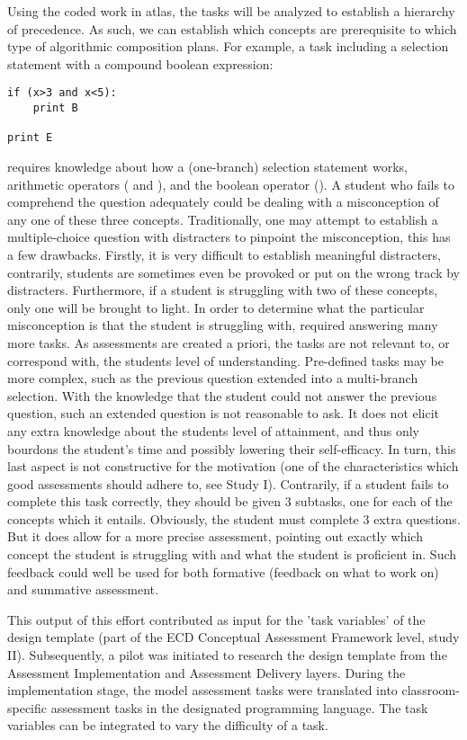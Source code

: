 Using the coded work in atlas, the tasks will be analyzed to establish a hierarchy of precedence. As such, we can establish which concepts are prerequisite to which type of algorithmic composition plans. For example, a task including a selection statement with a compound boolean expression:
\begin{verbatim}
if (x>3 and x<5):
    print B

print E
\end{verbatim}
requires knowledge about how a (one-branch) selection statement works, arithmetic operators (\jav{<} and \jav{>}), and the boolean operator (). A student who fails to comprehend the question adequately could be dealing with a misconception of any one of these three concepts. Traditionally, one may attempt to establish a multiple-choice question with distracters to pinpoint the misconception, this has a few drawbacks. Firstly, it is very difficult to establish meaningful distracters, contrarily, students are sometimes even be provoked or put on the wrong track by distracters. Furthermore, if a student is struggling with two of these concepts, only one will be brought to light. In order to determine what the particular misconception is that the student is struggling with, required answering many more tasks. As assessments are created a priori, the tasks are not relevant to, or correspond with, the students level of understanding. Pre-defined tasks may be more complex, such as the previous question extended into a multi-branch selection. With the knowledge that the student could not answer the previous question, such an extended question is not reasonable to ask. It does not elicit any extra knowledge about the students level of attainment, and thus only bourdons the student's time and possibly lowering their self-efficacy. In turn, this last aspect is not constructive for the motivation (one of the characteristics which good assessments should adhere to, see Study I). Contrarily, if a student fails to complete this task correctly, they should be given 3 subtasks, one for each of the concepts which it entails. Obviously, the student must complete 3 extra questions. But it does allow for a more precise assessment, pointing out exactly which concept the student is struggling with and what the student is proficient in. Such feedback could well be used for both formative (feedback on what to work on) and summative assessment.


 This output of this effort contributed as input for the 'task variables' of the design template (part of the ECD Conceptual Assessment Framework level, study II). Subsequently, a pilot was initiated to research the design template from the Assessment Implementation and Assessment Delivery layers. During the implementation stage, the model assessment tasks were translated into classroom-specific assessment tasks in the designated programming language. The task variables can be integrated to vary the difficulty of a task.




